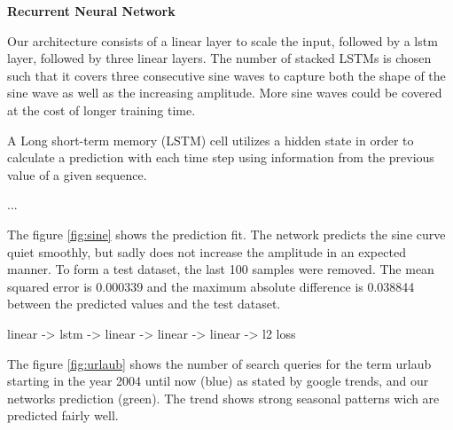 \documentclass{article}
\begin{document}
\begin{enumerate}
	
	\begin{item}
		\textbf{Recurrent Neural Network}
	\end{item}
	\begin{enumerate}
		
		\begin{item}
			Our architecture consists of a linear layer to scale the input, followed by a lstm layer, followed by three linear layers. The number of stacked LSTMs is chosen such that it covers three consecutive sine waves to capture both the shape of the sine wave as well as the increasing amplitude. More sine waves could be covered at the cost of longer training time.
		\end{item}
		
		
		
		\begin{item}
			A Long short-term memory (LSTM) cell utilizes a hidden state in order to calculate a prediction with each time step using information from the previous value of a given sequence.
			
		\end{item}
		
		\begin{item}
			...
		\end{item}
		
		\begin{item}
			The  figure \ref{fig:sine} shows the prediction fit. The network predicts the sine curve quiet smoothly, but sadly does not increase the amplitude in an expected manner. 
			To form a test dataset,  the last 100 samples were removed. 
			The mean squared error is 0.000339 and the maximum absolute difference is 0.038844 between the predicted values and the test dataset.
	
		\end{item}
		\begin{item}
			linear -> lstm -> linear -> linear -> linear -> l2 loss
		\end{item}
		
		\begin{item}
			The  figure \ref{fig:urlaub} shows the number of search queries for the term urlaub starting in the year 2004 until now (blue) as stated by google trends, and our networks prediction (green). The trend shows strong seasonal patterns wich are predicted fairly well.
		\end{item}
	\end{enumerate}

	
\end{enumerate}
\end{document}
